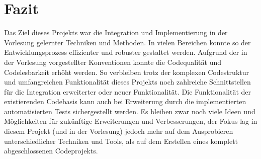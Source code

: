 \chapter{Fazit}
\label{ch:fazit}
Das Ziel dieses Projekts war die Integration und Implementierung in der Vorlesung gelernter Techniken und Methoden.
In vielen Bereichen konnte so der Entwicklungsprozess effizienter und robuster gestaltet werden.
Aufgrund der in der Vorlesung vorgestellter Konventionen konnte die Codequalität und Codelesbarkeit erhöht werden.
So verbleiben trotz der komplexen Codestruktur und umfangreichen Funktionalität dieses Projekts noch zahlreiche Schnittstellen für die Integration erweiterter oder neuer Funktionalität.
Die Funktionalität der existierenden Codebasis kann auch bei Erweiterung durch die implementierten automatisierten Tests sichergestellt werden.
Es bleiben zwar noch viele Ideen und Möglichkeiten für zukünftige Erweiterungen und Verbesserungen, der Fokus lag in diesem Projekt (und in der Vorlesung) jedoch mehr auf dem Ausprobieren unterschiedlicher Techniken und Tools, als auf dem Erstellen eines komplett abgeschlossenen Codeprojekts.